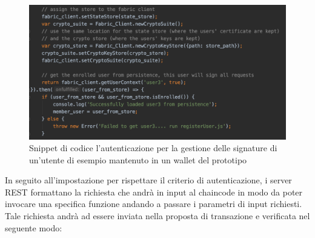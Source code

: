 \begin{figure}[h]
    \centering
    \includegraphics[width=1\textwidth]{img/aut-server.png}
    \caption{Snippet di codice l'autenticazione per la gestione delle signature di un'utente di esempio mantenuto in un wallet del prototipo}
    \label{autent-express-server}
\end{figure}
In seguito all'impostazione per rispettare il criterio di autenticazione, i server REST formattano la richiesta che andrà in input al chaincode in modo da poter invocare una specifica funzione andando a passare i parametri di input richiesti. Tale richiesta andrà ad essere inviata nella proposta di transazione e verificata nel seguente modo:

